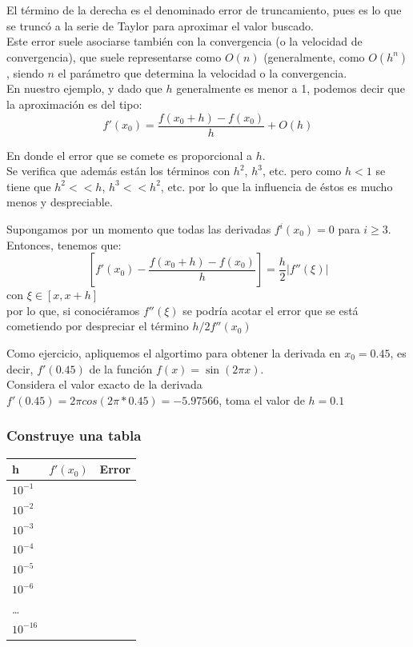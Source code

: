 \begin{frame}
El término de la derecha es el denominado error de truncamiento, pues es lo que se truncó
a la serie de Taylor para aproximar el valor buscado. 
\\
\medskip
Este error suele asociarse también con la convergencia (o la velocidad de convergencia), que suele representarse como $O(n)$ (generalmente, como $O(h^{n})$, siendo $n$ el parámetro que determina la velocidad o la convergencia. 
\\
\medskip
En nuestro ejemplo, y dado que $h$ generalmente es menor a 1, podemos decir que la aproximación es del tipo:
\[ f'(x_{0}) = \dfrac{f(x_{0} + h) - f(x_{0})}{h} +  O(h)\]
\end{frame}
\begin{frame}
En donde el error que se comete es proporcional a $h$.
\\
\medskip
Se verifica que además están los términos con $h^{2}$, $h^{3}$, etc. pero como $h<1$ se tiene que $h^{2}<<h$, $h^{3} << h^{2}$, etc. por lo que la influencia de éstos es mucho menos y despreciable.
\end{frame}
\begin{frame}
Supongamos por un momento que todas las derivadas $f^{i}(x_{0}) = 0$ para $i \geq 3$. Entonces, tenemos que:
\[ \left[ f'(x_{0}) - \dfrac{f(x_{0} + h) - f(x_{0})}{h} \right] = \dfrac{h}{2} \vert f''(\xi) \vert \]
con $\xi \in [x,x+h]$
\\
\medskip
por lo que, si conociéramos $f''(\xi)$ se podría acotar el error que se está cometiendo por despreciar el término $h/2 f''(x_{0})$
\end{frame}
\begin{frame}
Como ejercicio, apliquemos el algortimo para obtener la derivada en $x_{0}=0.45$, es decir,  $f'(0.45)$ de la función $f(x) = \sin(2 \pi x)$.
\\
\bigskip
Considera el valor exacto de la derivada $f'(0.45) = 2 \pi cos(2 \pi * 0.45) = -5.97566$, toma el valor de $h=0.1$
\end{frame}
\begin{frame}
\frametitle{Construye una tabla}
\begin{center}
\begin{tabular}{l | l | l}
h & $f'(x_{0})$ & Error \\ \hline
$10^{-1}$ & & \\ \hline
$10^{-2}$ & & \\ \hline
$10^{-3}$ & & \\ \hline
$10^{-4}$ & & \\ \hline
$10^{-5}$ & & \\ \hline
$10^{-6}$ & & \\ \hline
\ldots & & \\ \hline
$10^{-16}$ & &
\end{tabular}
\end{center}
\end{frame}
